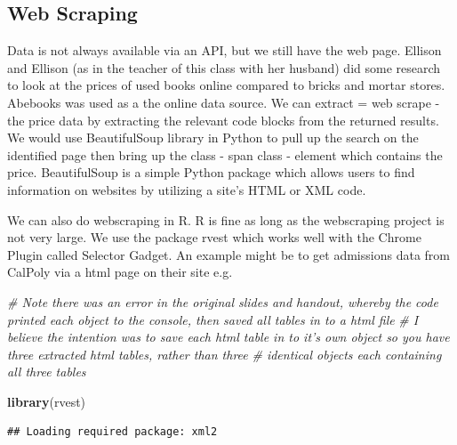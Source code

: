 \documentclass[]{book}
\newenvironment{Shaded}{\begin{snugshade}}{\end{snugshade}}
\newcommand{\KeywordTok}[1]{\textcolor[rgb]{0.13,0.29,0.53}{\textbf{#1}}}
\newcommand{\CommentTok}[1]{\textcolor[rgb]{0.56,0.35,0.01}{\textit{#1}}}
\newcommand{\NormalTok}[1]{#1}
\theoremstyle{definition}
\theoremstyle{definition}
\theoremstyle{definition}
\theoremstyle{remark}
\begin{document}
\subsection{Web Scraping}\label{web-scraping}

Data is not always available via an API, but we still have the web page.
Ellison and Ellison (as in the teacher of this class with her husband)
did some research to look at the prices of used books online compared to
bricks and mortar stores. Abebooks was used as a the online data source.
We can extract = web scrape - the price data by extracting the relevant
code blocks from the returned results. We would use BeautifulSoup
library in Python to pull up the search on the identified page then
bring up the class - span class - element which contains the price.
BeautifulSoup is a simple Python package which allows users to find
information on websites by utilizing a site's HTML or XML code.

We can also do webscraping in R. R is fine as long as the webscraping
project is not very large. We use the package rvest which works well
with the Chrome Plugin called Selector Gadget. An example might be to
get admissions data from CalPoly via a html page on their site e.g.

\begin{Shaded}
\begin{Highlighting}[]
\CommentTok{# Note there was an error in the original slides and handout, whereby the code printed each object to the console, then saved all tables in to a html file}
\CommentTok{# I believe the intention was to save each html table in to it's own object so you have three extracted html tables, rather than three}
\CommentTok{# identical objects each containing all three tables}

\KeywordTok{library}\NormalTok{(rvest)}
\end{Highlighting}
\end{Shaded}

\begin{verbatim}
## Loading required package: xml2
\end{verbatim}
\end{document}
